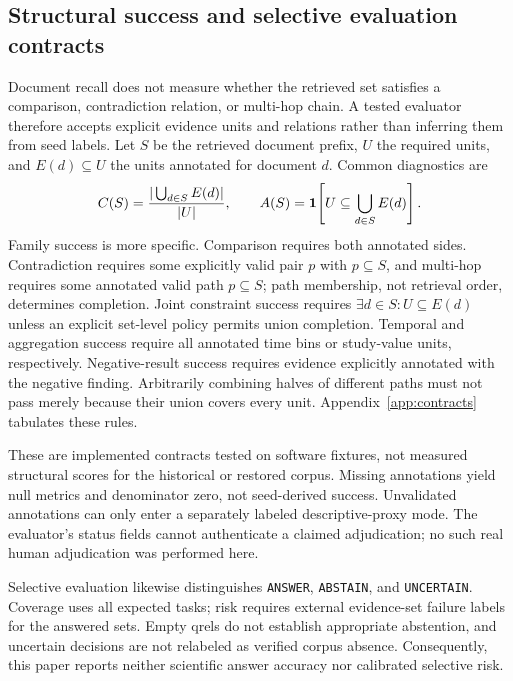 \subsection{Structural success and selective evaluation contracts}
\label{sec:structural}
Document recall does not measure whether the retrieved set satisfies a comparison, contradiction relation, or multi-hop chain. A tested evaluator therefore accepts explicit evidence units and relations rather than inferring them from seed labels. Let $S$ be the retrieved document prefix, $U$ the required units, and $E(d)\subseteq U$ the units annotated for document $d$. Common diagnostics are
\begin{equation}
 C(S)=\frac{|\bigcup_{d\in S}E(d)|}{|U|},\qquad
 A(S)=\mathbf{1}\!\left[U\subseteq\bigcup_{d\in S}E(d)\right].
\end{equation}
Family success is more specific. Comparison requires both annotated sides. Contradiction requires some explicitly valid pair $p$ with $p\subseteq S$, and multi-hop requires some annotated valid path $p\subseteq S$; path membership, not retrieval order, determines completion. Joint constraint success requires $\exists d\in S:U\subseteq E(d)$ unless an explicit set-level policy permits union completion. Temporal and aggregation success require all annotated time bins or study-value units, respectively. Negative-result success requires evidence explicitly annotated with the negative finding. Arbitrarily combining halves of different paths must not pass merely because their union covers every unit. Appendix~\ref{app:contracts} tabulates these rules.

These are implemented contracts tested on software fixtures, not measured structural scores for the historical or restored corpus. Missing annotations yield null metrics and denominator zero, not seed-derived success. Unvalidated annotations can only enter a separately labeled descriptive-proxy mode. The evaluator's status fields cannot authenticate a claimed adjudication; no such real human adjudication was performed here.

Selective evaluation likewise distinguishes \texttt{ANSWER}, \texttt{ABSTAIN}, and \texttt{UNCERTAIN}. Coverage uses all expected tasks; risk requires external evidence-set failure labels for the answered sets. Empty qrels do not establish appropriate abstention, and uncertain decisions are not relabeled as verified corpus absence. Consequently, this paper reports neither scientific answer accuracy nor calibrated selective risk.

